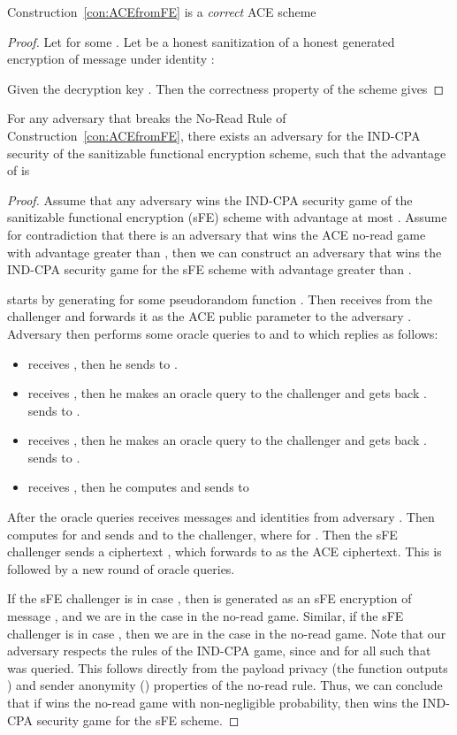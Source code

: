 \documentclass{llncs}
\begin{document}
\begin{lem} \label{lem:FEcorrect}
Construction~\ref{con:ACEfromFE} is a \emph{correct} ACE scheme \end{lem}

\begin{proof}
Let  for some . Let  be a honest sanitization of a honest generated encryption of message  under identity : 


Given the decryption key . Then the correctness property of the  scheme gives

\end{proof}

\begin{thm} \label{thm:ACE_sFE_no-read}
For any adversary  that breaks the No-Read Rule of Construction~\ref{con:ACEfromFE}, there exists an adversary  for the IND-CPA security of the sanitizable functional encryption scheme, such that the advantage of  is
	
\end{thm}

\begin{proof}
Assume that any adversary wins the IND-CPA security game of the sanitizable functional encryption (sFE) scheme with advantage at most .
Assume for contradiction that there is an adversary  that wins the ACE no-read game with advantage greater than , then we can construct an adversary  that wins the IND-CPA security game for the sFE scheme with advantage greater than .

 starts by generating  for some pseudorandom function . Then  receives  from the challenger and forwards it as the ACE public parameter to the adversary . 
Adversary  then performs some oracle queries to  and  to which  replies as follows: 
\begin{itemize}
\item  receives , then he sends  to .
\item  receives , then he makes an oracle query  to the challenger and gets back .  sends  to .
\item  receives , then he makes an oracle query  to the challenger and gets back .  sends  to .
\item  receives , then he computes  and sends to  
\end{itemize}
After the oracle queries  receives messages  and identities  from adversary . Then  computes  for  and sends  and  to the challenger, where  for .
Then the sFE challenger sends a ciphertext , which  forwards to  as the ACE ciphertext. 
This is followed by a new round of oracle queries.

If the sFE challenger is in case , then  is generated as an sFE encryption of message , and we are in the case  in the no-read game. Similar, if the sFE challenger is in case , then we are in the case  in the no-read game. Note that our adversary respects the rules of the IND-CPA game, since  and  for all  such that  was queried. This follows directly from the payload privacy (the function outputs ) and sender anonymity () properties of the no-read rule.
Thus, we can conclude that if  wins the no-read game with non-negligible probability, then  wins the IND-CPA security game for the sFE scheme.
\end{proof}
\end{document}
